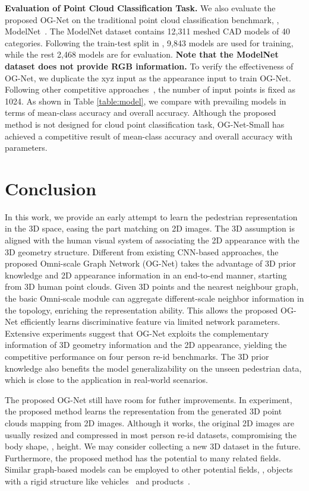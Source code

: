 \textbf{Evaluation of Point Cloud Classification Task.} We also evaluate the proposed OG-Net on the traditional point cloud classification benchmark, \ie, ModelNet~\cite{wu20153d}. The ModelNet dataset contains 12,311 meshed CAD models of 40 categories. Following the train-test split in \cite{wang2019dynamic}, 9,843 models are used for training, while the rest 2,468 models are for evaluation. \textbf{Note that the ModelNet dataset does not provide RGB information.} To verify the effectiveness of OG-Net, we duplicate the xyz input as the appearance input to train OG-Net. Following other competitive approaches~\cite{wang2019dynamic,qi2017pointnet,qi2017pointnet++}, the number of input points is fixed as 1024. As shown in Table \ref{table:model}, we compare with prevailing models in terms of mean-class accuracy and overall accuracy. Although the proposed method is not designed for cloud point classification task, OG-Net-Small has achieved a competitive result of  mean-class accuracy and  overall accuracy with  parameters. 

\section{Conclusion}
In this work, we provide an early attempt to learn the pedestrian representation in the 3D space, easing the part matching on 2D images. The 3D assumption is aligned with the human visual system of associating the 2D appearance with the 3D geometry structure. 
Different from existing CNN-based approaches, the proposed Omni-scale Graph Network (OG-Net) takes the advantage of  3D prior knowledge and 2D appearance information in an end-to-end manner, starting from 3D human point clouds. Given 3D points and the nearest neighbour graph, the basic Omni-scale module can aggregate different-scale neighbor information in the topology, enriching the representation ability. This allows the proposed OG-Net efficiently learns discriminative feature via limited network parameters. Extensive experiments suggest that OG-Net exploits the complementary information of 3D geometry information and the 2D appearance, yielding the competitive performance on four person re-id benchmarks. The 3D prior knowledge also benefits the model generalizability on the unseen pedestrian data, which is close to the application in real-world scenarios. 

The proposed OG-Net still have room for futher improvements. In experiment, the proposed method learns the representation from the generated 3D point clouds mapping from 2D images. Although it works, the original 2D images are usually resized and compressed in most person re-id datasets, compromising the body shape, \eg, height. We may consider collecting a new 3D dataset in the future. Furthermore, the proposed method has the potential to many related fields. Similar graph-based models can be employed to other potential fields, \eg, objects with a rigid structure like vehicles~\cite{tang2019cityflow,zhang2019part} and products~\cite{wei2019rpc,liu2012hi}.  



{\footnotesize


}



